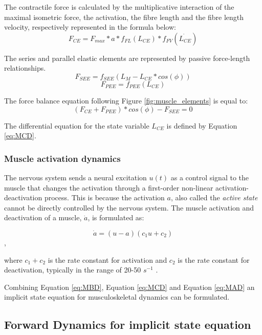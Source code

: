 The contractile force is calculated by the multiplicative interaction of the maximal isometric force, the activation, the fibre length and the fibre length velocity, respectively represented in the formula below:
\begin{equation}
    F_{CE} = F_{max}*a*f_{FL}(L_{CE})*f_{FV}(\dot{L_{CE}})
\end{equation}

The series and parallel elastic elements are represented by passive force-length relationships.
\begin{equation}
    F_{SEE} = f_{SEE}(L_{M}-L_{CE}*cos(\phi))
\end{equation}
\begin{equation}
    F_{PEE} = f_{PEE}(L_{CE})
\end{equation}

The force balance equation following Figure \ref{fig:muscle_elements} is equal to:
\begin{equation}
    (F_{CE}+F_{PEE})*cos(\phi) - F_{SEE} = 0
    \label{eq:MCD}
\end{equation}

The differential equation for the state variable $L_{CE}$ is defined by Equation \ref{eq:MCD}.  
\newline
\subsubsection{Muscle activation dynamics}

The nervous system sends a neural excitation $u(t)$ as a control signal to the muscle that changes the activation through a first-order non-linear activation-deactivation process. This is because the activation $a$, also called the \textit{ active state} cannot be directly controlled by the nervous system. The  muscle activation and deactivation of a muscle, $\dot{a}$, is formulated as:

\begin{equation}
    \dot{a} = (u-a)(c_{1}u + c_{2})
    \label{eq:MAD}
\end{equation},

where $c_{1} + c_{2}$ is the rate constant for activation and $c_{2}$ is the rate constant for deactivation, typically in the range of 20-50 $s^{-1}$ \cite{IMP}.

Combining Equation \ref{eq:MBD}, Equation \ref{eq:MCD} and Equation \ref{eq:MAD} an implicit state equation for musculoskeletal dynamics can be formulated.  

\subsection{Forward Dynamics for implicit state equation}\label{forward}

